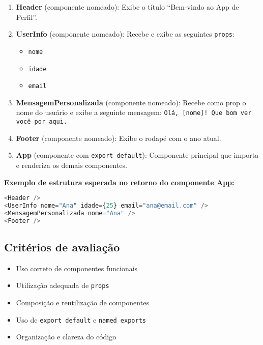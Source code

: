 \begin{enumerate}
  \item \textbf{Header} (componente nomeado): Exibe o título “Bem-vindo ao App de Perfil”.
  
  \item \textbf{UserInfo} (componente nomeado): Recebe e exibe as seguintes \texttt{props}:
  \begin{itemize}
    \item \texttt{nome}
    \item \texttt{idade}
    \item \texttt{email}
  \end{itemize}
  
  \item \textbf{MensagemPersonalizada} (componente nomeado): Recebe como prop o nome do usuário e exibe a seguinte mensagem: \texttt{Olá, [nome]! Que bom ver você por aqui.}
  
  \item \textbf{Footer} (componente nomeado): Exibe o rodapé com o ano atual.
  
  \item \textbf{App} (componente com \texttt{export default}): Componente principal que importa e renderiza os demais componentes.
\end{enumerate}



\vspace{0.5cm}
\noindent
\textbf{Exemplo de estrutura esperada no retorno do componente App:}

\begin{lstlisting}[language=JavaScript]
<Header />
<UserInfo nome="Ana" idade={25} email="ana@email.com" />
<MensagemPersonalizada nome="Ana" />
<Footer />
\end{lstlisting}

\vspace{0.5cm}

\subsection*{Critérios de avaliação}

\begin{itemize}
  \item Uso correto de componentes funcionais
  \item Utilização adequada de \texttt{props}
  \item Composição e reutilização de componentes
  \item Uso de \texttt{export default} e \texttt{named exports}
  \item Organização e clareza do código
\end{itemize}






